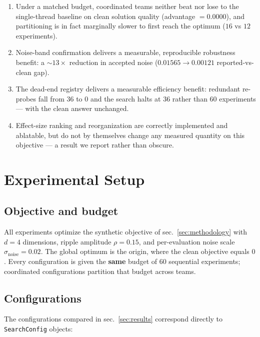 \documentclass[
]{article}
\providecommand{\tightlist}{%
  \setlength{\itemsep}{0pt}\setlength{\parskip}{0pt}}
\begin{document}
\begin{enumerate}
\def\labelenumi{\arabic{enumi}.}
\tightlist
\item
  Under a matched budget, coordinated teams neither beat nor lose to the
  single-thread baseline on clean solution quality (advantage
  \(= 0.0000\)), and partitioning is in fact marginally slower to first
  reach the optimum (\(16\) vs \(12\) experiments).
\item
  Noise-band confirmation delivers a measurable, reproducible robustness
  benefit: a \(\sim 13\times\) reduction in accepted noise
  (\(0.01565 \to 0.00121\) reported-vs-clean gap).
\item
  The dead-end registry delivers a measurable efficiency benefit:
  redundant re-probes fall from \(36\) to \(0\) and the search halts at
  \(36\) rather than \(60\) experiments --- with the clean answer
  unchanged.
\item
  Effect-size ranking and reorganization are correctly implemented and
  ablatable, but do not by themselves change any measured quantity on
  this objective --- a result we report rather than obscure.
\end{enumerate}

\newpage

\section{Experimental Setup}\label{sec:setup}

\subsection{Objective and budget}\label{objective-and-budget}

All experiments optimize the synthetic objective of
sec.~\ref{sec:methodology} with \(d = 4\) dimensions, ripple amplitude
\(\rho = 0.15\), and per-evaluation noise scale
\(\sigma_{\text{noise}} = 0.02\). The global optimum is the origin,
where the clean objective equals \(0\). Every configuration is given the
\textbf{same} budget of \(60\) sequential experiments; coordinated
configurations partition that budget across teams.

\subsection{Configurations}\label{configurations}

The configurations compared in sec.~\ref{sec:results} correspond
directly to \texttt{SearchConfig} objects:
\end{document}
